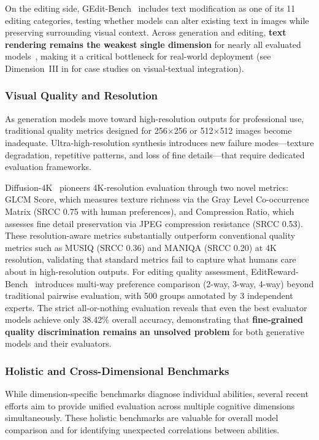 On the editing side, GEdit-Bench~\citep{Liu2025Step1XEditAP} includes text modification as one of its 11 editing categories, testing whether models can alter existing text in images while preserving surrounding visual context. Across generation and editing, \textbf{text rendering remains the weakest single dimension} for nearly all evaluated models~\citep{OneIG-Bench}, making it a critical bottleneck for real-world deployment (see Dimension~III in  for case studies on visual-textual integration).

\subsubsection{Visual Quality and Resolution}

As generation models move toward high-resolution outputs for professional use, traditional quality metrics designed for 256$\times$256 or 512$\times$512 images become inadequate. Ultra-high-resolution synthesis introduces new failure modes---texture degradation, repetitive patterns, and loss of fine details---that require dedicated evaluation frameworks.

Diffusion-4K~\citep{Diffusion-4K} pioneers 4K-resolution evaluation through two novel metrics: GLCM Score, which measures texture richness via the Gray Level Co-occurrence Matrix (SRCC 0.75 with human preferences), and Compression Ratio, which assesses fine detail preservation via JPEG compression resistance (SRCC 0.53). These resolution-aware metrics substantially outperform conventional quality metrics such as MUSIQ (SRCC 0.36) and MANIQA (SRCC 0.20) at 4K resolution, validating that standard metrics fail to capture what humans care about in high-resolution outputs. For editing quality assessment, EditReward-Bench~\citep{wu2025editreward} introduces multi-way preference comparison (2-way, 3-way, 4-way) beyond traditional pairwise evaluation, with 500 groups annotated by 3 independent experts. The strict all-or-nothing evaluation reveals that even the best evaluator models achieve only 38.42\% overall accuracy, demonstrating that \textbf{fine-grained quality discrimination remains an unsolved problem} for both generative models and their evaluators.


\subsubsection{Holistic and Cross-Dimensional Benchmarks}

While dimension-specific benchmarks diagnose individual abilities, several recent efforts aim to provide unified evaluation across multiple cognitive dimensions simultaneously. These holistic benchmarks are valuable for overall model comparison and for identifying unexpected correlations between abilities.

